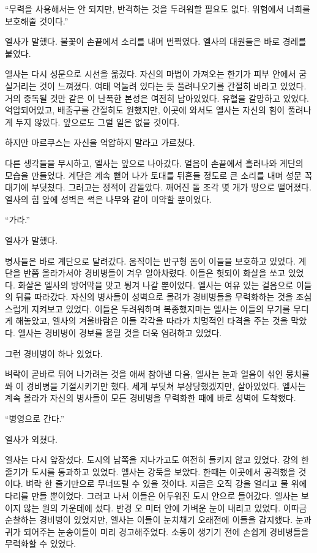 ``무력을 사용해서는 안 되지만, 반격하는 것을 두려워할 필요도 없다. 위험에서 너희를 보호해줄 것이다.''

엘사가 말했다. 불꽃이 손끝에서 소리를 내며 번쩍였다. 엘사의 대원들은 바로 경례를 붙였다.

엘사는 다시 성문으로 시선을 옮겼다. 자신의 마법이 가져오는 한기가 피부 안에서 굼실거리는 것이 느껴졌다. 여태 억눌려 있다는 듯 풀려나오기를 간절히 바라고 있었다. 거의 중독될 것만 같은 이 난폭한 본성은 여전히 남아있었다. 유혈을 갈망하고 있었다. 억압되어있고, 배출구를 간절히도 원했지만, 이곳에 와서도 엘사는 자신의 힘이 풀려나게 두지 않았다. 앞으로도 그럴 일은 없을 것이다.

하지만 마르쿠스는 자신을 억압하지 말라고 가르쳤다.

다른 생각들을 무시하고, 엘사는 앞으로 나아갔다. 얼음이 손끝에서 흘러나와 계단의 모습을 만들었다. 계단은 계속 뻗어 나가 토대를 뒤흔들 정도로 큰 소리를 내며 성문 꼭대기에 부딪쳤다. 그러고는 정적이 감돌았다. 깨어진 돌 조각 몇 개가 땅으로 떨어졌다. 엘사의 힘 앞에 성벽은 썩은 나무와 같이 미약할 뿐이었다.

``가라.''

엘사가 말했다.

병사들은 바로 계단으로 달려갔다. 움직이는 반구형 돔이 이들을 보호하고 있었다. 계단을 반쯤 올라가서야 경비병들이 겨우 알아차렸다. 이들은 헛되이 화살을 쏘고 있었다. 화살은 엘사의 방어막을 맞고 튕겨 나갈 뿐이었다. 엘사는 여유 있는 걸음으로 이들의 뒤를 따라갔다. 자신의 병사들이 성벽으로 몰려가 경비병들을 무력화하는 것을 조심스럽게 지켜보고 있었다. 이들은 두려워하며 복종했지마는 엘사는 이들의 무기를 무디게 해놓았고, 엘사의 겨울바람은 이들 각각을 따라가 치명적인 타격을 주는 것을 막았다. 엘사는 경비병이 경보를 울릴 것을 더욱 염려하고 있었다.

그런 경비병이 하나 있었다.

벼락이 곧바로 튀어 나가려는 것을 애써 참아낸 다음, 엘사는 눈과 얼음이 섞인 뭉치를 쏴 이 경비병을 기절시키기만 했다. 세게 부딪쳐 부상당했겠지만, 살아있었다. 엘사는 계속 올라가 자신의 병사들이 모든 경비병을 무력화한 때에 바로 성벽에 도착했다.

``병영으로 간다.''

엘사가 외쳤다.

엘사는 다시 앞장섰다. 도시의 남쪽을 지나가고도 여전히 들키지 않고 있었다. 강의 한 줄기가 도시를 통과하고 있었다. 엘사는 강둑을 보았다. 한때는 이곳에서 공격했을 것이다. 벼락 한 줄기만으로 무너뜨릴 수 있을 것이다. 지금은 오직 강을 얼리고 물 위에 다리를 만들 뿐이었다. 그러고 나서 이들은 어두워진 도시 안으로 들어갔다. 엘사는 보이지 않는 원의 가운데에 섰다. 반경 오 미터 안에 가벼운 눈이 내리고 있었다. 이따금 순찰하는 경비병이 있었지만, 엘사는 이들이 눈치채기 오래전에 이들을 감지했다. 눈과 귀가 되어주는 눈송이들이 미리 경고해주었다. 소동이 생기기 전에 손쉽게 경비병들을 무력화할 수 있었다.

